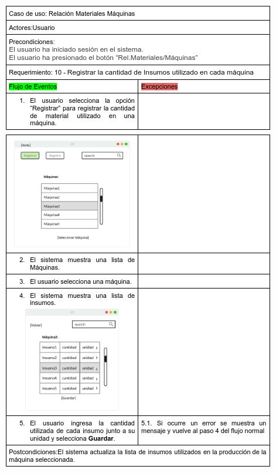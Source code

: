 \documentclass{article}
\begin{document}
    \begin{center}
        \includegraphics[width=1\linewidth]{imagenes/10_registrar_insumo_maquina.png}
        \includegraphics[width=1\linewidth]{imagenes/10_registrar_insumo_maquina2.png} 
    \end{center}
    
\end{document}
